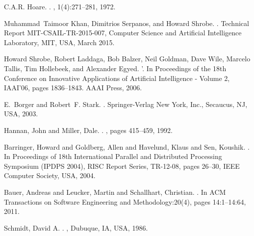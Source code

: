 \documentclass[conference]{IEEEtran}
\begin{document}
\begin{thebibliography}{1}






C.A.R. Hoare.
.
, 1(4):271--281, 1972.

Muhammad~Taimoor Khan, Dimitrios Serpanos, and Howard Shrobe.
.
\newblock Technical Report MIT-CSAIL-TR-2015-007, Computer Science and
  Artificial Intelligence Laboratory, MIT, USA, March 2015.

{Howard Shrobe, Robert Laddaga, Bob Balzer, Neil Goldman, Dave Wile, Marcelo
  Tallis, Tim Hollebeek, and Alexander Egyed}.
'.
\newblock In {Proceedings of the 18th Conference on Innovative Applications
  of Artificial Intelligence - Volume 2}, IAAI'06, pages 1836--1843. AAAI
  Press, 2006.

{E.~Borger and Robert~F. Stark}.
.
\newblock Springer-Verlag New York, Inc., Secaucus, NJ, USA, 2003.



{Hannan, John and Miller, Dale}.
.
, pages 415--459, 1992.

{Barringer, Howard and Goldberg, Allen and Havelund,
              Klaus and Sen, Koushik}.
.
\newblock In {Proceedings of 18th International Parallel and Distributed Processing
             Symposium (IPDPS 2004), RISC Report Series, TR-12-08}, pages 26--30, IEEE Computer Society, USA, 2004.



{Bauer, Andreas and Leucker, Martin and Schallhart, Christian}.
.
\newblock In {ACM Transactions on Software Engineering and Methodology:20(4)}, pages 14:1--14:64, 2011.


{Schmidt, David A.}
.
, {Dubuque, IA, USA}, {1986}.


\end{thebibliography}
\end{document}
